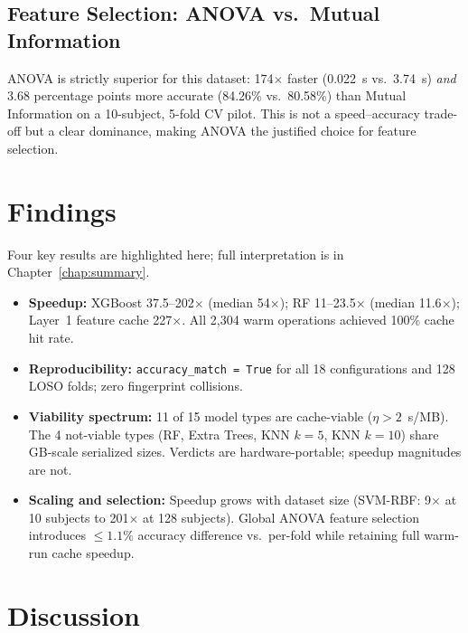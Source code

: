 \subsection{Feature Selection: ANOVA vs.\ Mutual Information}
\label{sec:results_anova}

ANOVA is strictly superior for this dataset: 174$\times$ faster (0.022~s vs.\ 3.74~s) \textit{and} 3.68 percentage points more accurate (84.26\% vs.\ 80.58\%) than Mutual Information on a 10-subject, 5-fold CV pilot. This is not a speed--accuracy trade-off but a clear dominance, making ANOVA the justified choice for feature selection.

\section{Findings}
\label{sec:findings}

Four key results are highlighted here; full interpretation is in
Chapter~\ref{chap:summary}.

\begin{itemize}
\item \textbf{Speedup:} XGBoost 37.5--202$\times$ (median 54$\times$);
 RF 11--23.5$\times$ (median 11.6$\times$); Layer~1 feature cache
 227$\times$. All 2{,}304 warm operations achieved 100\% cache hit rate.

\item \textbf{Reproducibility:} \texttt{accuracy\_match = True} for all
 18 configurations and 128 LOSO folds; zero fingerprint collisions.

\item \textbf{Viability spectrum:} 11 of 15 model types are cache-viable
 ($\eta > 2$~s/MB). The 4 not-viable types (RF, Extra Trees, KNN $k=5$, KNN $k=10$)
 share GB-scale serialized sizes. Verdicts are hardware-portable;
 speedup magnitudes are not.

\item \textbf{Scaling and selection:} Speedup grows with dataset size
 (SVM-RBF: 9$\times$ at 10 subjects to 201$\times$ at 128 subjects).
 Global ANOVA feature selection introduces $\leq 1.1\%$ accuracy difference
 vs.\ per-fold while retaining full warm-run cache speedup.
\end{itemize}

\section{Discussion}
\label{sec:discussion}

